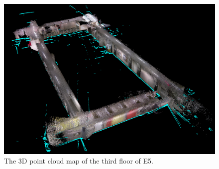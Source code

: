 \documentclass[letterpaper, 10 pt, conference]{ieeeconf}  %
\begin{document}
	\begin{figure}[!ht]
		\centering
		\includegraphics[width=1.0\columnwidth]{Figures/3rdfloor_point_cloud}
		\caption{The 3D point cloud map of the third floor of E5.}
		\label{third_point_cloud}
	\end{figure}
	
\end{document}
